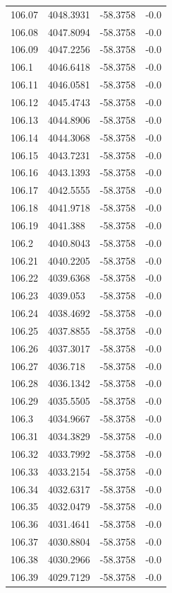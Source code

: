 \begin{table}[H]
\begin{tabular}{llll}
106.07 & 4048.3931 & -58.3758 & -0.0 \\
106.08 & 4047.8094 & -58.3758 & -0.0 \\
106.09 & 4047.2256 & -58.3758 & -0.0 \\
106.1 & 4046.6418 & -58.3758 & -0.0 \\
106.11 & 4046.0581 & -58.3758 & -0.0 \\
106.12 & 4045.4743 & -58.3758 & -0.0 \\
106.13 & 4044.8906 & -58.3758 & -0.0 \\
106.14 & 4044.3068 & -58.3758 & -0.0 \\
106.15 & 4043.7231 & -58.3758 & -0.0 \\
106.16 & 4043.1393 & -58.3758 & -0.0 \\
106.17 & 4042.5555 & -58.3758 & -0.0 \\
106.18 & 4041.9718 & -58.3758 & -0.0 \\
106.19 & 4041.388 & -58.3758 & -0.0 \\
106.2 & 4040.8043 & -58.3758 & -0.0 \\
106.21 & 4040.2205 & -58.3758 & -0.0 \\
106.22 & 4039.6368 & -58.3758 & -0.0 \\
106.23 & 4039.053 & -58.3758 & -0.0 \\
106.24 & 4038.4692 & -58.3758 & -0.0 \\
106.25 & 4037.8855 & -58.3758 & -0.0 \\
106.26 & 4037.3017 & -58.3758 & -0.0 \\
106.27 & 4036.718 & -58.3758 & -0.0 \\
106.28 & 4036.1342 & -58.3758 & -0.0 \\
106.29 & 4035.5505 & -58.3758 & -0.0 \\
106.3 & 4034.9667 & -58.3758 & -0.0 \\
106.31 & 4034.3829 & -58.3758 & -0.0 \\
106.32 & 4033.7992 & -58.3758 & -0.0 \\
106.33 & 4033.2154 & -58.3758 & -0.0 \\
106.34 & 4032.6317 & -58.3758 & -0.0 \\
106.35 & 4032.0479 & -58.3758 & -0.0 \\
106.36 & 4031.4641 & -58.3758 & -0.0 \\
106.37 & 4030.8804 & -58.3758 & -0.0 \\
106.38 & 4030.2966 & -58.3758 & -0.0 \\
106.39 & 4029.7129 & -58.3758 & -0.0 \\

\end{tabular}
\end{table}
